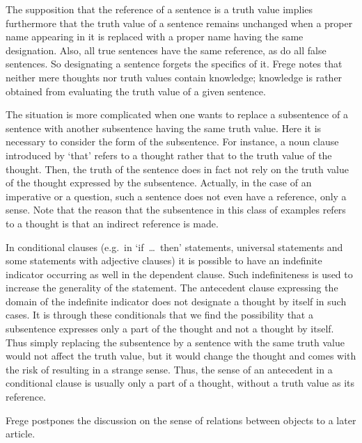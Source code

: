 \documentclass{article}
\begin{document}
The supposition that the reference of a sentence is a truth value implies furthermore that the truth value of a sentence remains unchanged when a proper name appearing in it is replaced with a proper name having the same designation. Also, all true sentences have the same reference, as do all false sentences. So designating a sentence forgets the specifics of it. Frege notes that neither mere thoughts nor truth values contain knowledge; knowledge is rather obtained from evaluating the truth value of a given sentence.

The situation is more complicated when one wants to replace a subsentence of a sentence with another subsentence having the same truth value. Here it is necessary to consider the form of the subsentence. For instance, a noun clause introduced by `that' refers to a thought rather that to the truth value of the thought. Then, the truth of the sentence does in fact not rely on the truth value of the thought expressed by the subsentence. Actually, in the case of an imperative or a question, such a sentence does not even have a reference, only a sense. Note that the reason that the subsentence in this class of examples refers to a thought is that an indirect reference is made. 

In conditional clauses (e.g.~in `if~\dots~then' statements, universal statements and some statements with adjective clauses) it is possible to have an indefinite indicator occurring as well in the dependent clause. Such indefiniteness is used to increase the generality of the statement. The antecedent clause expressing the domain of the indefinite indicator does not designate a thought by itself in such cases. It is through these conditionals that we find the possibility that a subsentence expresses only a part of the thought and not a thought by itself. Thus simply replacing the subsentence by a sentence with the same truth value would not affect the truth value, but it would change the thought and comes with the risk of resulting in a strange sense. Thus, the sense of an antecedent in a conditional clause is usually only a part of a thought, without a truth value as its reference.

Frege postpones the discussion on the sense of relations between objects to a
later article. 
\end{document}
